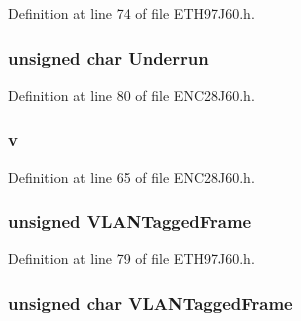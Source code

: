 Definition at line 74 of file E\+T\+H97\+J60.\+h.

\hypertarget{union_t_x_s_t_a_t_u_s_a83080188049b2744197b3c2ee9345992}{}
\subsubsection[{Underrun}]{\setlength{\rightskip}{0pt plus 5cm}unsigned char Underrun}\label{union_t_x_s_t_a_t_u_s_a83080188049b2744197b3c2ee9345992}


Definition at line 80 of file E\+N\+C28\+J60.\+h.

\hypertarget{union_t_x_s_t_a_t_u_s_ab360d67f1123be408cf61c449299a8b9}{}
\subsubsection[{v}]{ v}\label{union_t_x_s_t_a_t_u_s_ab360d67f1123be408cf61c449299a8b9}


Definition at line 65 of file E\+N\+C28\+J60.\+h.

\hypertarget{union_t_x_s_t_a_t_u_s_ab9afd71b76f0bc0bfffa49a7c4b5a64b}{}
\subsubsection[{V\+L\+A\+N\+Tagged\+Frame}]{\setlength{\rightskip}{0pt plus 5cm}unsigned V\+L\+A\+N\+Tagged\+Frame}\label{union_t_x_s_t_a_t_u_s_ab9afd71b76f0bc0bfffa49a7c4b5a64b}


Definition at line 79 of file E\+T\+H97\+J60.\+h.

\hypertarget{union_t_x_s_t_a_t_u_s_ae8832d85a6775462ce15d8bfca606094}{}
\subsubsection[{V\+L\+A\+N\+Tagged\+Frame}]{\setlength{\rightskip}{0pt plus 5cm}unsigned char V\+L\+A\+N\+Tagged\+Frame}\label{union_t_x_s_t_a_t_u_s_ae8832d85a6775462ce15d8bfca606094}


